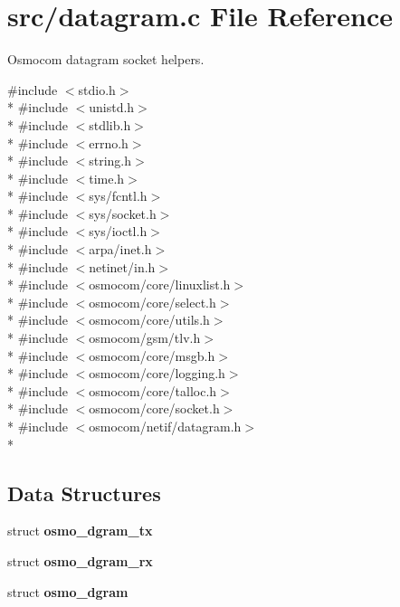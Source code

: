 \section{src/datagram.c File Reference}
\label{datagram_8c}


Osmocom datagram socket helpers.  


{\ttfamily \#include $<$stdio.\+h$>$}\\*
{\ttfamily \#include $<$unistd.\+h$>$}\\*
{\ttfamily \#include $<$stdlib.\+h$>$}\\*
{\ttfamily \#include $<$errno.\+h$>$}\\*
{\ttfamily \#include $<$string.\+h$>$}\\*
{\ttfamily \#include $<$time.\+h$>$}\\*
{\ttfamily \#include $<$sys/fcntl.\+h$>$}\\*
{\ttfamily \#include $<$sys/socket.\+h$>$}\\*
{\ttfamily \#include $<$sys/ioctl.\+h$>$}\\*
{\ttfamily \#include $<$arpa/inet.\+h$>$}\\*
{\ttfamily \#include $<$netinet/in.\+h$>$}\\*
{\ttfamily \#include $<$osmocom/core/linuxlist.\+h$>$}\\*
{\ttfamily \#include $<$osmocom/core/select.\+h$>$}\\*
{\ttfamily \#include $<$osmocom/core/utils.\+h$>$}\\*
{\ttfamily \#include $<$osmocom/gsm/tlv.\+h$>$}\\*
{\ttfamily \#include $<$osmocom/core/msgb.\+h$>$}\\*
{\ttfamily \#include $<$osmocom/core/logging.\+h$>$}\\*
{\ttfamily \#include $<$osmocom/core/talloc.\+h$>$}\\*
{\ttfamily \#include $<$osmocom/core/socket.\+h$>$}\\*
{\ttfamily \#include $<$osmocom/netif/datagram.\+h$>$}\\*
\subsection*{Data Structures}
\begin{DoxyCompactItemize}
\item 
struct {\bf osmo\+\_\+dgram\+\_\+tx}
\item 
struct {\bf osmo\+\_\+dgram\+\_\+rx}
\item 
struct {\bf osmo\+\_\+dgram}
\end{DoxyCompactItemize}
